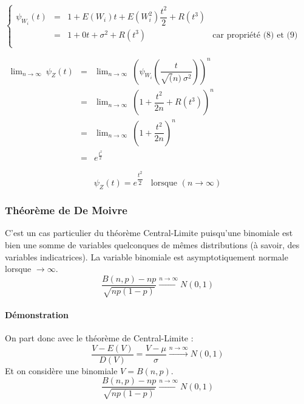 \begin{center}
$\left\{\begin{array}{LCLC}
\psi_{W_i}(t) &=& 1 + E ( W_i ) t + E (W_i^2) \dfrac{t^2}{2}+R(t^3)\\
              &=& 1 + 0 t + \sigma^2 + R(t^3)&\text{car propriété (8) et (9)}\\
\end{array}\right.$
\end{center}
\begin{center}
$\begin{array}{LCL}
\lim_{n\rightarrow\infty}\ \psi_{Z}(t) &=& \lim_{n\rightarrow\infty}\ \left( \psi_{W_i} \left( \dfrac{t}{\sqrt(n)\ \sigma^2} \right) \right)^n \\[0.3cm]
            &=& \lim_{n\rightarrow\infty}\ \left( 1 + \dfrac{t^2}{2n} + R(t^3) \right)^n\\
            &=& \lim_{n\rightarrow\infty}\ \left( 1 + \dfrac{t^2}{2n} \right)^n\\
            &=& e^{\frac{t^2}{2}}
\end{array}$
\end{center}
$$\boxed{\psi_{Z}(t) = e^{\dfrac{t^2}{2}}\ \ \ \ \text{lorsque }(n\rightarrow\infty)}$$









\newpage
\subsubsection{Théorème de De Moivre}
C'est un cas particulier du théorème Central-Limite puisqu'une binomiale est bien une somme de variables quelconques de mêmes distributions (à savoir, des variables indicatrices). La variable binomiale est asymptotiquement normale lorsque $\rightarrow\infty$.
$$\boxed{\dfrac{B(n,p)-np}{\sqrt{np(1-p)}} \stackrel{n\rightarrow\infty}{\rightarrow} N(0,1)}$$
\paragraph{Démonstration}
On part donc avec le théorème de Central-Limite :
$$\dfrac{V-E(V)}{D(V)} = \dfrac{V-\mu}{\sigma} \stackrel{n\rightarrow\infty}{\rightarrow} N(0,1)$$
Et on considère une binomiale $V = B(n,p)$.
$$\boxed{\dfrac{B(n,p)-np}{\sqrt{np(1-p)}} \stackrel{n\rightarrow\infty}{\rightarrow} N(0,1)}$$

